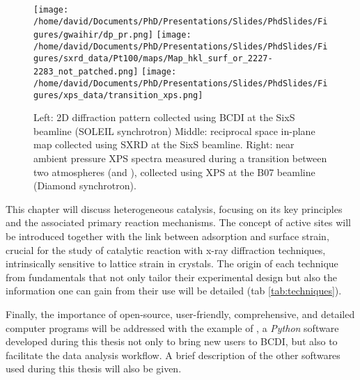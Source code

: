 \begin{figure}[!htb]
    \centering
    \texttt{[image: /home/david/Documents/PhD/Presentations/Slides/PhdSlides/Figures/gwaihir/dp\_pr.png]}
    \texttt{[image: /home/david/Documents/PhD/Presentations/Slides/PhdSlides/Figures/sxrd\_data/Pt100/maps/Map\_hkl\_surf\_or\_2227-2283\_not\_patched.png]}
    \texttt{[image: /home/david/Documents/PhD/Presentations/Slides/PhdSlides/Figures/xps\_data/transition\_xps.png]}
    \caption{
    Left: 2D diffraction pattern collected using BCDI at the SixS beamline (SOLEIL synchrotron)
    Middle: reciprocal space in-plane map collected using SXRD at the SixS beamline.
    Right: near ambient pressure XPS spectra measured during a transition between two atmospheres (\argon  and \dioxygen), collected using XPS at the B07 beamline (Diamond synchrotron).
    }
    \label{fig:TechniquesDataExamples}
\end{figure}

This chapter will discuss heterogeneous catalysis, focusing on its key principles and the associated primary reaction mechanisms.
The concept of active sites will be introduced together with the link between adsorption and surface strain, crucial for the study of catalytic reaction with x-ray diffraction techniques, intrinsically sensitive to lattice strain in crystals.
The origin of each technique from fundamentals that not only tailor their experimental design but also the information one can gain from their use will be detailed (tab \ref{tab:techniques}).

Finally, the importance of open-source, user-friendly, comprehensive, and detailed computer programs will be addressed with the example of , a \textit{Python} software developed during this thesis not only to bring new users to BCDI, but also to facilitate the data analysis workflow.
A brief description of the other softwares used during this thesis will also be given.